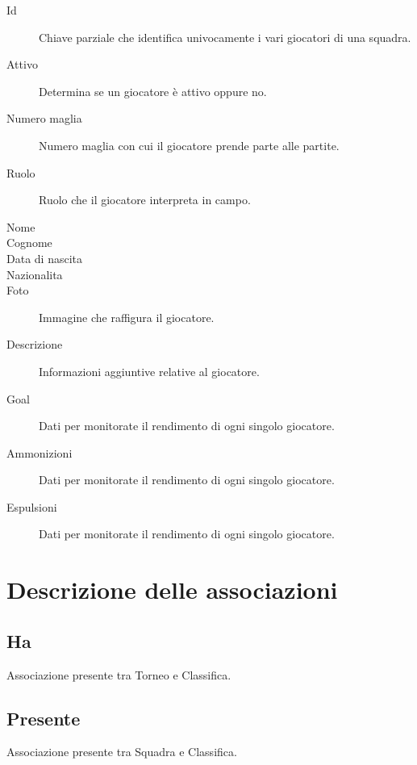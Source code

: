 		\begin{description}
			
			\item[Id]
			Chiave parziale che identifica univocamente i vari giocatori di una squadra.
			
			\item[Attivo]
			Determina se un giocatore è attivo oppure no.
			
			\item[Numero maglia]
			Numero maglia con cui il giocatore prende parte alle partite.
			
			\item[Ruolo]
			Ruolo che il giocatore interpreta in campo.
			
			\item[Nome]
			
			
			\item[Cognome]
			
			
			\item[Data di nascita]
			
			
			\item[Nazionalita]
			
			
			\item[Foto]
			Immagine che raffigura il giocatore.
			
			\item[Descrizione]
			Informazioni aggiuntive relative al giocatore.
			
			\item[Goal]
			Dati per monitorate il rendimento di ogni singolo giocatore.
			
			\item[Ammonizioni]
			Dati per monitorate il rendimento di ogni singolo giocatore.
			
			\item[Espulsioni]
			Dati per monitorate il rendimento di ogni singolo giocatore.
			
		\end{description}

\section{Descrizione delle associazioni}
	
	\subsection{Ha}
	Associazione presente tra Torneo e Classifica.
	
	\subsection{Presente}
	Associazione presente tra Squadra e Classifica.
	
